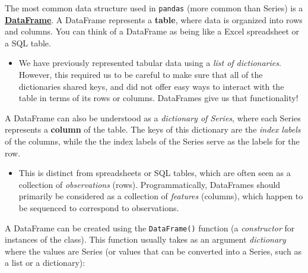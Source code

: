 \documentclass[]{book}
\providecommand{\tightlist}{%
  \setlength{\itemsep}{0pt}\setlength{\parskip}{0pt}}
\begin{document}
The most common data structure used in \texttt{pandas} (more common than
Series) is a
\href{http://pandas.pydata.org/pandas-docs/stable/generated/pandas.DataFrame.html}{\textbf{DataFrame}}.
A DataFrame represents a \textbf{table}, where data is organized into
rows and columns. You can think of a DataFrame as being like a Excel
spreadsheet or a SQL table.

\begin{itemize}
\tightlist
\item
  We have previously represented tabular data using a \emph{list of
  dictionaries}. However, this required us to be careful to make sure
  that all of the dictionaries shared keys, and did not offer easy ways
  to interact with the table in terms of its rows or columns. DataFrames
  give us that functionality!
\end{itemize}

A DataFrame can also be understood as a \emph{dictionary of Series},
where each Series represents a \textbf{column} of the table. The keys of
this dictionary are the \emph{index labels} of the columns, while the
the index labels of the Series serve as the labels for the row.

\begin{itemize}
\tightlist
\item
  This is distinct from spreadsheets or SQL tables, which are often seen
  as a collection of \emph{observations} (rows). Programmatically,
  DataFrames should primarily be considered as a collection of
  \emph{features} (columns), which happen to be sequenced to correspond
  to observations.
\end{itemize}

A DataFrame can be created using the \texttt{DataFrame()} function (a
\emph{constructor} for instances of the class). This function usually
takes as an argument \emph{dictionary} where the values are Series (or
values that can be converted into a Series, such as a list or a
dictionary):
\end{document}
